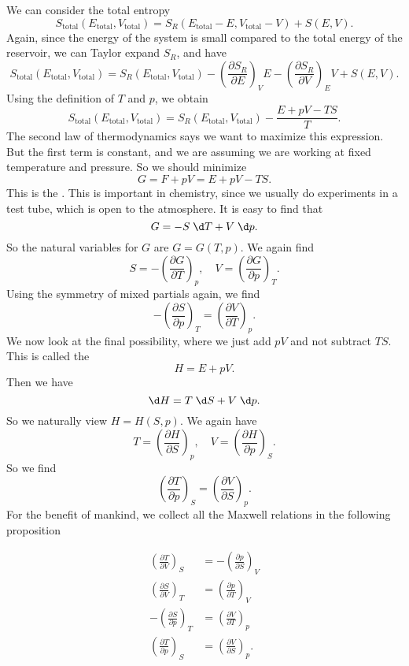 \documentclass[a4paper]{article}
\begin{document}
We can consider the total entropy
\[
  S_{\mathrm{total}}(E_{\mathrm{total}}, V_{\mathrm{total}}) = S_R(E_{\mathrm{total}} - E, V_{\mathrm{total}} - V) + S(E, V).
\]
Again, since the energy of the system is small compared to the total energy of the reservoir, we can Taylor expand $S_R$, and have
\[
  S_{\mathrm{total}}(E_{\mathrm{total}}, V_{\mathrm{total}}) = S_R(E_{\mathrm{total}}, V_{\mathrm{total}}) - \left(\frac{\partial S_R}{\partial E}\right)_V E - \left(\frac{\partial S_R}{\partial V}\right)_E V + S(E, V).
\]
Using the definition of $T$ and $p$, we obtain
\[
  S_{\mathrm{total}}(E_{\mathrm{total}}, V_{\mathrm{total}}) = S_R(E_{\mathrm{total}}, V_{\mathrm{total}}) - \frac{E + pV - TS}{T}.
\]
The second law of thermodynamics says we want to maximize this expression. But the first term is constant, and we are assuming we are working at fixed temperature and pressure. So we should minimize
\[
  G = F + pV = E + pV - TS.
\]
This is the . This is important in chemistry, since we usually do experiments in a test tube, which is open to the atmosphere. It is easy to find that
\[
  G = - S \;\d T + V \;\d p.
\]
So the natural variables for $G$ are $G = G(T, p)$. We again find
\[
  S = -\left(\frac{\partial G}{\partial T}\right)_p,\quad V = \left(\frac{\partial G}{\partial p}\right)_T.
\]
Using the symmetry of mixed partials again, we find
\[
  - \left(\frac{\partial S}{\partial p}\right)_T = \left(\frac{\partial V}{\partial T}\right)_p.
\]
We now look at the final possibility, where we just add $pV$ and not subtract $TS$. This is called the 
\[
  H = E + pV.
\]
Then we have
\[
  \d H = T\;\d S + V \;\d p.
\]
So we naturally view $H = H(S, p)$. We again have
\[
  T = \left(\frac{\partial H}{\partial S}\right)_p,\quad V = \left(\frac{\partial H}{\partial p}\right)_S.
\]
So we find
\[
  \left(\frac{\partial T}{\partial p}\right)_S = \left(\frac{\partial V}{\partial S}\right)_p.
\]
For the benefit of mankind, we collect all the Maxwell relations in the following proposition
\begin{prop}
  \begin{align*}
    \left(\frac{\partial T}{\partial V}\right)_S &= - \left(\frac{\partial p}{\partial S}\right)_V\\
    \left(\frac{\partial S}{\partial V}\right)_T &= \left(\frac{\partial p}{\partial T}\right)_V\\
    - \left(\frac{\partial S}{\partial p}\right)_T &= \left(\frac{\partial V}{\partial T}\right)_p\\
    \left(\frac{\partial T}{\partial p}\right)_S &= \left(\frac{\partial V}{\partial S}\right)_p.
  \end{align*}
\end{prop}
\end{document}
